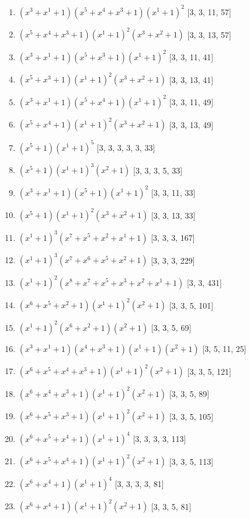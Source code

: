 \documentclass[10pt,twocolumn]{article}
\begin{document}
\begin{enumerate}
\item $(x^{3} + x^{1} + 1)(x^{5} + x^{4} + x^{3} + 1)(x^{1} + 1)^{2}$  [3, 3, 11, 57]
\item $(x^{5} + x^{4} + x^{3} + 1)(x^{1} + 1)^{2}(x^{3} + x^{2} + 1)$  [3, 3, 13, 57]
\item $(x^{3} + x^{1} + 1)(x^{5} + x^{3} + 1)(x^{1} + 1)^{2}$  [3, 3, 11, 41]
\item $(x^{5} + x^{3} + 1)(x^{1} + 1)^{2}(x^{3} + x^{2} + 1)$  [3, 3, 13, 41]
\item $(x^{3} + x^{1} + 1)(x^{5} + x^{4} + 1)(x^{1} + 1)^{2}$  [3, 3, 11, 49]
\item $(x^{5} + x^{4} + 1)(x^{1} + 1)^{2}(x^{3} + x^{2} + 1)$  [3, 3, 13, 49]
\item $(x^{5} + 1)(x^{1} + 1)^{5}$  [3, 3, 3, 3, 3, 33]
\item $(x^{5} + 1)(x^{1} + 1)^{3}(x^{2} + 1)$  [3, 3, 3, 5, 33]
\item $(x^{3} + x^{1} + 1)(x^{5} + 1)(x^{1} + 1)^{2}$  [3, 3, 11, 33]
\item $(x^{5} + 1)(x^{1} + 1)^{2}(x^{3} + x^{2} + 1)$  [3, 3, 13, 33]
\item $(x^{1} + 1)^{3}(x^{7} + x^{5} + x^{2} + x^{1} + 1)$  [3, 3, 3, 167]
\item $(x^{1} + 1)^{3}(x^{7} + x^{6} + x^{5} + x^{2} + 1)$  [3, 3, 3, 229]
\item $(x^{1} + 1)^{2}(x^{8} + x^{7} + x^{5} + x^{3} + x^{2} + x^{1} + 1)$  [3, 3, 431]
\item $(x^{6} + x^{5} + x^{2} + 1)(x^{1} + 1)^{2}(x^{2} + 1)$  [3, 3, 5, 101]
\item $(x^{1} + 1)^{2}(x^{6} + x^{2} + 1)(x^{2} + 1)$  [3, 3, 5, 69]
\item $(x^{3} + x^{1} + 1)(x^{4} + x^{3} + 1)(x^{1} + 1)(x^{2} + 1)$  [3, 5, 11, 25]
\item $(x^{6} + x^{5} + x^{4} + x^{3} + 1)(x^{1} + 1)^{2}(x^{2} + 1)$  [3, 3, 5, 121]
\item $(x^{6} + x^{4} + x^{3} + 1)(x^{1} + 1)^{2}(x^{2} + 1)$  [3, 3, 5, 89]
\item $(x^{6} + x^{5} + x^{3} + 1)(x^{1} + 1)^{2}(x^{2} + 1)$  [3, 3, 5, 105]
\item $(x^{6} + x^{5} + x^{4} + 1)(x^{1} + 1)^{4}$  [3, 3, 3, 3, 113]
\item $(x^{6} + x^{5} + x^{4} + 1)(x^{1} + 1)^{2}(x^{2} + 1)$  [3, 3, 5, 113]
\item $(x^{6} + x^{4} + 1)(x^{1} + 1)^{4}$  [3, 3, 3, 3, 81]
\item $(x^{6} + x^{4} + 1)(x^{1} + 1)^{2}(x^{2} + 1)$  [3, 3, 5, 81]

\end{enumerate}
\end{document}
